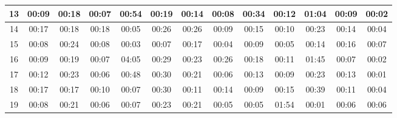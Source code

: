 \begin{center}
\begin{sideways}
\begin{tabular}{|l|l|l|l|l|l|l|l|l|l|l|l|l|}
\hline
\multicolumn{1}{|c|}{13} & \multicolumn{1}{c|}{00:09} & \multicolumn{1}{c|}{00:18} & \multicolumn{1}{c|}{00:07} & \multicolumn{1}{c|}{00:54} & \multicolumn{1}{c|}{00:19} & \multicolumn{1}{c|}{00:14} & \multicolumn{1}{c|}{00:08} & \multicolumn{1}{c|}{00:34} & \multicolumn{1}{c|}{00:12} & \multicolumn{1}{c|}{01:04} & \multicolumn{1}{c|}{00:09} & \multicolumn{1}{c|}{00:02} \\ 
\hline
\multicolumn{1}{|c|}{14} & \multicolumn{1}{c|}{00:17} & \multicolumn{1}{c|}{00:18} & \multicolumn{1}{c|}{00:18} & \multicolumn{1}{c|}{00:05} & \multicolumn{1}{c|}{00:26} & \multicolumn{1}{c|}{00:26} & \multicolumn{1}{c|}{00:09} & \multicolumn{1}{c|}{00:15} & \multicolumn{1}{c|}{00:10} & \multicolumn{1}{c|}{00:23} & \multicolumn{1}{c|}{00:14} & \multicolumn{1}{c|}{00:04} \\ 
\hline
\multicolumn{1}{|c|}{15} & \multicolumn{1}{c|}{00:08} & \multicolumn{1}{c|}{00:24} & \multicolumn{1}{c|}{00:08} & \multicolumn{1}{c|}{00:03} & \multicolumn{1}{c|}{00:07} & \multicolumn{1}{c|}{00:17} & \multicolumn{1}{c|}{00:04} & \multicolumn{1}{c|}{00:09} & \multicolumn{1}{c|}{00:05} & \multicolumn{1}{c|}{00:14} & \multicolumn{1}{c|}{00:16} & \multicolumn{1}{c|}{00:07} \\ 
\hline
\multicolumn{1}{|c|}{16} & \multicolumn{1}{c|}{00:09} & \multicolumn{1}{c|}{00:19} & \multicolumn{1}{c|}{00:07} & \multicolumn{1}{c|}{04:05} & \multicolumn{1}{c|}{00:29} & \multicolumn{1}{c|}{00:23} & \multicolumn{1}{c|}{00:26} & \multicolumn{1}{c|}{00:18} & \multicolumn{1}{c|}{00:11} & \multicolumn{1}{c|}{01:45} & \multicolumn{1}{c|}{00:07} & \multicolumn{1}{c|}{00:02} \\ 
\hline
\multicolumn{1}{|c|}{17} & \multicolumn{1}{c|}{00:12} & \multicolumn{1}{c|}{00:23} & \multicolumn{1}{c|}{00:06} & \multicolumn{1}{c|}{00:48} & \multicolumn{1}{c|}{00:30} & \multicolumn{1}{c|}{00:21} & \multicolumn{1}{c|}{00:06} & \multicolumn{1}{c|}{00:13} & \multicolumn{1}{c|}{00:09} & \multicolumn{1}{c|}{00:23} & \multicolumn{1}{c|}{00:13} & \multicolumn{1}{c|}{00:01} \\ 
\hline
\multicolumn{1}{|c|}{18} & \multicolumn{1}{c|}{00:17} & \multicolumn{1}{c|}{00:17} & \multicolumn{1}{c|}{00:10} & \multicolumn{1}{c|}{00:07} & \multicolumn{1}{c|}{00:30} & \multicolumn{1}{c|}{00:11} & \multicolumn{1}{c|}{00:14} & \multicolumn{1}{c|}{00:09} & \multicolumn{1}{c|}{00:15} & \multicolumn{1}{c|}{00:39} & \multicolumn{1}{c|}{00:11} & \multicolumn{1}{c|}{00:04} \\ 
\hline
\multicolumn{1}{|c|}{19} & \multicolumn{1}{c|}{00:08} & \multicolumn{1}{c|}{00:21} & \multicolumn{1}{c|}{00:06} & \multicolumn{1}{c|}{00:07} & \multicolumn{1}{c|}{00:23} & \multicolumn{1}{c|}{00:21} & \multicolumn{1}{c|}{00:05} & \multicolumn{1}{c|}{00:05} & \multicolumn{1}{c|}{01:54} & \multicolumn{1}{c|}{00:01} & \multicolumn{1}{c|}{00:06} & \multicolumn{1}{c|}{00:06} \\ 
\hline
\end{tabular}
\end{sideways}
\end{center}
\normalsize

